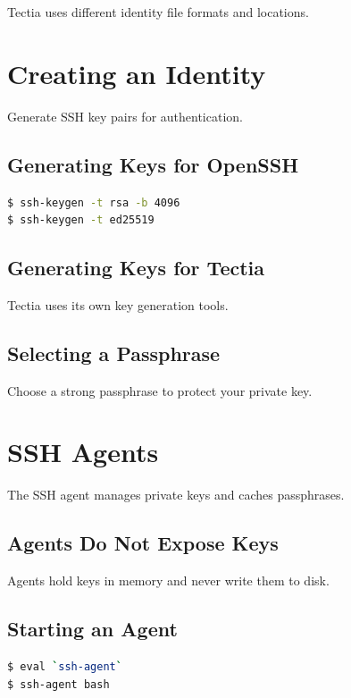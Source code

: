 \documentclass[12pt]{book}
\begin{document}
Tectia uses different identity file formats and locations.

\section{Creating an Identity}

Generate SSH key pairs for authentication.

\subsection{Generating Keys for OpenSSH}

\begin{lstlisting}[language=bash]
$ ssh-keygen -t rsa -b 4096
$ ssh-keygen -t ed25519
\end{lstlisting}

\subsection{Generating Keys for Tectia}

Tectia uses its own key generation tools.

\subsection{Selecting a Passphrase}

Choose a strong passphrase to protect your private key.

\section{SSH Agents}

The SSH agent manages private keys and caches passphrases.

\subsection{Agents Do Not Expose Keys}

Agents hold keys in memory and never write them to disk.

\subsection{Starting an Agent}

\begin{lstlisting}[language=bash]
$ eval `ssh-agent`
$ ssh-agent bash
\end{lstlisting}
\end{document}

